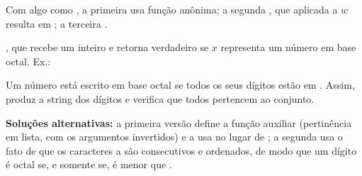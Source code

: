 {{\begin{Qlist}
\begin{solution}
        Com algo como , a primeira usa função anônima; a segunda , que aplicada a $w$ resulta em ; a terceira .

        \end{solution}

        \item[(e)] , que recebe um inteiro
             e retorna verdadeiro se $x$ representa um número em base octal. Ex.:


        \begin{solution}
        Um número está escrito em base octal se todos os seus dígitos estão em
        . Assim,  produz a string dos dígitos e
         verifica que todos pertencem ao conjunto.


        \textbf{Soluções alternativas:} a primeira versão define a função auxiliar  (pertinência em lista, com os argumentos invertidos) e a usa no lugar de ; a segunda usa o fato de que os caracteres  a  são consecutivos e ordenados, de modo que um dígito é octal se, e somente se, é menor que .

        \end{solution}
    \end{Qlist}
} }

